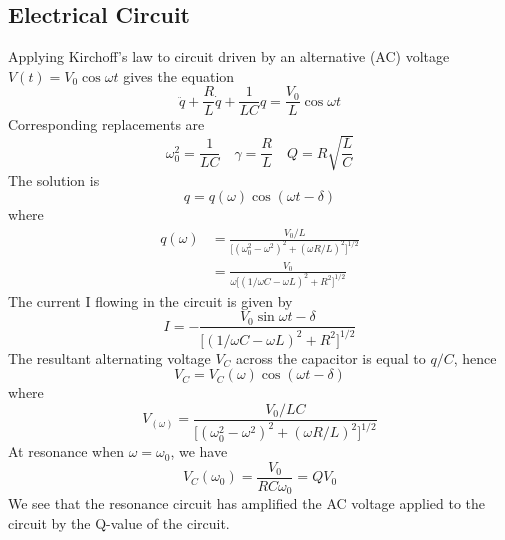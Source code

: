 \documentclass[../../../main.tex]{subfiles}
\begin{document}
\subsection*{Electrical Circuit}
Applying Kirchoff's law to circuit driven by an alternative (AC) voltage $V (t) = V_0 \cos \omega t$ gives the equation
\begin{equation*}
    \ddot{q}+\frac{R}{L}\dot{q}+\frac{1}{LC}q=\frac{V_0}{L} \cos \omega t
\end{equation*}
Corresponding replacements are
\begin{equation*}
    \omega_0^2=\frac{1}{LC}\quad\gamma=\frac{R}{L}\quad Q=R\sqrt{\frac{L}{C}}
\end{equation*}
The solution is 
\begin{equation*}
    q=q(\omega)\cos (\omega t-\delta )
\end{equation*}
where
\begin{align*}
    q(\omega)&=\frac{V_0/L}{\big[(\omega_0^2- \omega^2)^2 +(\omega R/L)^2\big]^{1/2}}\\
    &= \frac{V_0}{\omega\big[(1/\omega C- \omega L)^2 +R^2\big]^{1/2} }
\end{align*}
The current I flowing in the circuit is given by
\begin{equation*}
    I=-\frac{V_0\sin \omega t-\delta}{\big[(1/\omega C- \omega L)^2 +R^2\big]^{1/2} }
\end{equation*}
The resultant alternating voltage $V_C$ across the capacitor is equal to $q/C$, hence
\begin{equation*}
    V_C=V_C(\omega)\cos (\omega t-\delta )
\end{equation*}
where
\begin{equation*}
    V_(\omega)= \frac{V_0/LC}{\big[(\omega_0^2- \omega^2)^2 +(\omega R/L)^2\big]^{1/2}} 
\end{equation*}
At resonance when $\omega = \omega_0$, we have
\begin{equation*}
    V_C(\omega_0)=\frac{V_0}{RC\omega_0}=QV_0
\end{equation*}
We see that the resonance circuit has amplified the AC voltage applied to the circuit by the Q-value of the circuit. 
\end{document}
